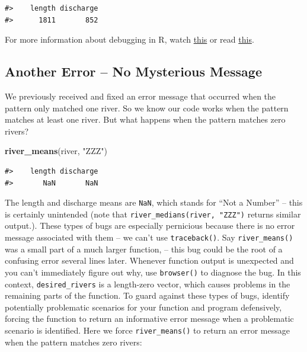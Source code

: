 \documentclass[
]{book}
\newenvironment{Shaded}{\begin{snugshade}}{\end{snugshade}}
\newcommand{\KeywordTok}[1]{\textcolor[rgb]{0.13,0.29,0.53}{\textbf{#1}}}
\newcommand{\NormalTok}[1]{#1}
\newcommand{\StringTok}[1]{\textcolor[rgb]{0.31,0.60,0.02}{#1}}
\begin{document}
\begin{verbatim}
#>    length discharge 
#>      1811       852
\end{verbatim}

For more information about debugging in R, watch \href{https://www.youtube.com/watch?v=vgYS-F8opgE}{this} or read \href{https://adv-r.hadley.nz/debugging.html}{this}.

\hypertarget{error-zeromatch}{%
\subsection{Another Error -- No Mysterious Message}\label{error-zeromatch}}

We previously received and fixed an error message that occurred when the pattern only matched one river. So we know our code works when the pattern matches at least one river. But what happens when the pattern matches zero rivers?

\begin{Shaded}
\begin{Highlighting}[]
\KeywordTok{river_means}\NormalTok{(river, }\StringTok{"ZZZ"}\NormalTok{)}
\end{Highlighting}
\end{Shaded}

\begin{verbatim}
#>    length discharge 
#>       NaN       NaN
\end{verbatim}

The length and discharge means are \texttt{NaN}, which stands for ``Not a Number'' -- this is certainly unintended (note that \texttt{river\_medians(river,\ "ZZZ")} returns similar output.). These types of bugs are especially pernicious because there is no error message associated with them -- we can't use \texttt{traceback()}. Say \texttt{river\_means()} was a small part of a much larger function, -- this bug could be the root of a confusing error several lines later. Whenever function output is unexpected and you can't immediately figure out why, use \texttt{browser()} to diagnose the bug. In this context, \texttt{desired\_rivers} is a length-zero vector, which causes problems in the remaining parts of the function. To guard against these types of bugs, identify potentially problematic scenarios for your function and program defensively, forcing the function to return an informative error message when a problematic scenario is identified. Here we force \texttt{river\_means()} to return an error message when the pattern matches zero rivers:
\end{document}
